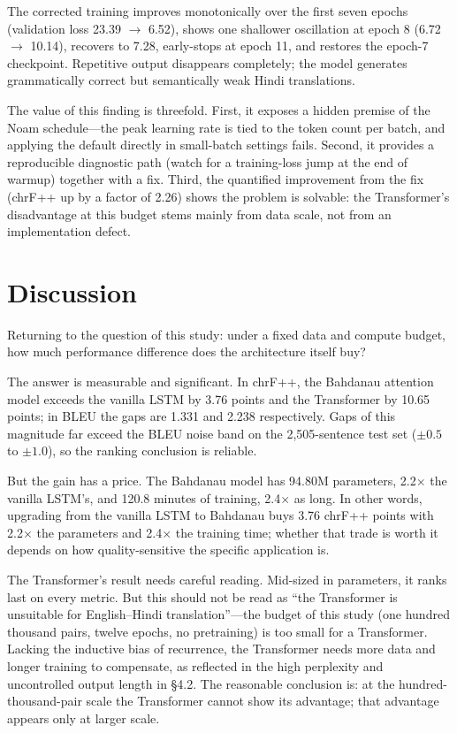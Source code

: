 \documentclass[a4paper,12pt]{vpcoe}
\begin{document}
The corrected training improves monotonically over the first seven epochs (validation loss 23.39 $\rightarrow$ 6.52), shows one shallower oscillation at epoch 8 (6.72 $\rightarrow$ 10.14), recovers to 7.28, early-stops at epoch 11, and restores the epoch-7 checkpoint. Repetitive output disappears completely; the model generates grammatically correct but semantically weak Hindi translations.

The value of this finding is threefold. First, it exposes a hidden premise of the Noam schedule---the peak learning rate is tied to the token count per batch, and applying the default directly in small-batch settings fails. Second, it provides a reproducible diagnostic path (watch for a training-loss jump at the end of warmup) together with a fix. Third, the quantified improvement from the fix (chrF++ up by a factor of 2.26) shows the problem is solvable: the Transformer's disadvantage at this budget stems mainly from data scale, not from an implementation defect.

\section{Discussion}
Returning to the question of this study: under a fixed data and compute budget, how much performance difference does the architecture itself buy?

The answer is measurable and significant. In chrF++, the Bahdanau attention model exceeds the vanilla LSTM by 3.76 points and the Transformer by 10.65 points; in BLEU the gaps are 1.331 and 2.238 respectively. Gaps of this magnitude far exceed the BLEU noise band on the 2,505-sentence test set ($\pm0.5$ to $\pm1.0$), so the ranking conclusion is reliable.

But the gain has a price. The Bahdanau model has 94.80M parameters, 2.2$\times$ the vanilla LSTM's, and 120.8 minutes of training, 2.4$\times$ as long. In other words, upgrading from the vanilla LSTM to Bahdanau buys 3.76 chrF++ points with 2.2$\times$ the parameters and 2.4$\times$ the training time; whether that trade is worth it depends on how quality-sensitive the specific application is.

The Transformer's result needs careful reading. Mid-sized in parameters, it ranks last on every metric. But this should not be read as ``the Transformer is unsuitable for English--Hindi translation''---the budget of this study (one hundred thousand pairs, twelve epochs, no pretraining) is too small for a Transformer. Lacking the inductive bias of recurrence, the Transformer needs more data and longer training to compensate, as reflected in the high perplexity and uncontrolled output length in \S 4.2. The reasonable conclusion is: at the hundred-thousand-pair scale the Transformer cannot show its advantage; that advantage appears only at larger scale.
\end{document}
